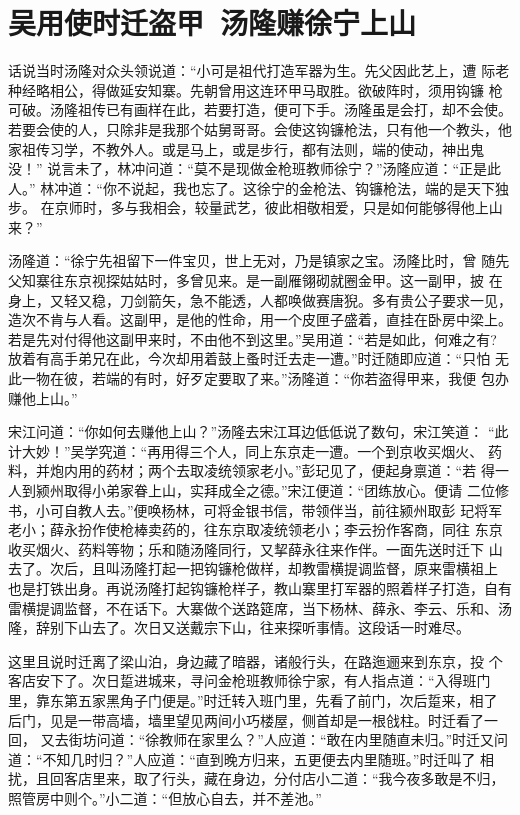 \chapter{吴用使时迁盗甲~汤隆赚徐宁上山}

话说当时汤隆对众头领说道：“小可是祖代打造军器为生。先父因此艺上，遭
际老种经略相公，得做延安知寨。先朝曾用这连环甲马取胜。欲破阵时，须用钩镰
枪可破。汤隆祖传已有画样在此，若要打造，便可下手。汤隆虽是会打，却不会使。
若要会使的人，只除非是我那个姑舅哥哥。会使这钩镰枪法，只有他一个教头，他
家祖传习学，不教外人。或是马上，或是步行，都有法则，端的使动，神出鬼没！”
说言未了，林冲问道：“莫不是现做金枪班教师徐宁？”汤隆应道：“正是此人。”
林冲道：“你不说起，我也忘了。这徐宁的金枪法、钩镰枪法，端的是天下独步。
在京师时，多与我相会，较量武艺，彼此相敬相爱，只是如何能够得他上山来？”

汤隆道：“徐宁先祖留下一件宝贝，世上无对，乃是镇家之宝。汤隆比时，曾
随先父知寨往东京视探姑姑时，多曾见来。是一副雁翎砌就圈金甲。这一副甲，披
在身上，又轻又稳，刀剑箭矢，急不能透，人都唤做赛唐猊。多有贵公子要求一见，
造次不肯与人看。这副甲，是他的性命，用一个皮匣子盛着，直挂在卧房中梁上。
若是先对付得他这副甲来时，不由他不到这里。”吴用道：“若是如此，何难之有?
放着有高手弟兄在此，今次却用着鼓上蚤时迁去走一遭。”时迁随即应道：“只怕
无此一物在彼，若端的有时，好歹定要取了来。”汤隆道：“你若盗得甲来，我便
包办赚他上山。”

宋江问道：“你如何去赚他上山？”汤隆去宋江耳边低低说了数句，宋江笑道：
“此计大妙！”吴学究道：“再用得三个人，同上东京走一遭。一个到京收买烟火、
药料，并炮内用的药材；两个去取凌统领家老小。”彭玘见了，便起身禀道：“若
得一人到颍州取得小弟家眷上山，实拜成全之德。”宋江便道：“团练放心。便请
二位修书，小可自教人去。”便唤杨林，可将金银书信，带领伴当，前往颍州取彭
玘将军老小；薛永扮作使枪棒卖药的，往东京取凌统领老小；李云扮作客商，同往
东京收买烟火、药料等物；乐和随汤隆同行，又挈薛永往来作伴。一面先送时迁下
山去了。次后，且叫汤隆打起一把钩镰枪做样，却教雷横提调监督，原来雷横祖上
也是打铁出身。再说汤隆打起钩镰枪样子，教山寨里打军器的照着样子打造，自有
雷横提调监督，不在话下。大寨做个送路筵席，当下杨林、薛永、李云、乐和、汤
隆，辞别下山去了。次日又送戴宗下山，往来探听事情。这段话一时难尽。

这里且说时迁离了梁山泊，身边藏了暗器，诸般行头，在路迤逦来到东京，投
个客店安下了。次日踅进城来，寻问金枪班教师徐宁家，有人指点道：“入得班门
里，靠东第五家黑角子门便是。”时迁转入班门里，先看了前门，次后踅来，相了
后门，见是一带高墙，墙里望见两间小巧楼屋，侧首却是一根戗柱。时迁看了一回，
又去街坊问道：“徐教师在家里么？”人应道：“敢在内里随直未归。”时迁又问
道：“不知几时归？”人应道：“直到晚方归来，五更便去内里随班。”时迁叫了
相扰，且回客店里来，取了行头，藏在身边，分付店小二道：“我今夜多敢是不归，
照管房中则个。”小二道：“但放心自去，并不差池。”

